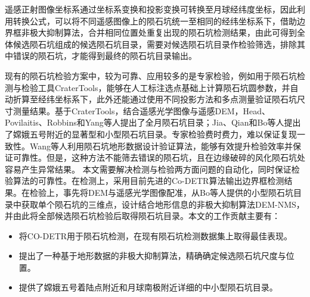 遥感正射图像坐标系通过坐标系变换和投影变换可转换至月球经纬度坐标，因此利用转换公式，可以将不同遥感图像上的陨石坑统一至相同的经纬坐标系下，借助边界框非极大抑制算法，合并相同位置处重复出现的陨石坑检测结果，由此可得到全体候选陨石坑组成的候选陨石坑目录，需要对候选陨石坑目录作检验筛选，排除其中错误的陨石坑，才能得到最终的陨石坑目录输出。

现有的陨石坑检验方案中，较为可靠、应用较多的是专家检验，例如用于陨石坑检测与检验工具CraterTools\cite{kneisslMapprojectionindependentCraterSizefrequency2011}，能够在人工标注选点基础上计算陨石坑圆参数，并自动折算至经纬坐标系下，此外还能通过使用不同投影方法和多点测量验证陨石坑尺寸测量结果。基于CraterTools，结合遥感光学图像与遥感DEM，Head\cite{headGlobalDistributionLarge2010}、Povilaitis\cite{povilaitisCraterDensityDifferences2018}、Robbins\cite{robbinsNewGlobalDatabase2019}和Yang\cite{yangLunarImpactCrater2020}等人提出了全月陨石坑目录；Jia\cite{jiaCatalogueImpactCraters2020}、Qian\cite{qianCopernicanaged200Ma2021}和Bo\cite{boCatalogueMeterscaleImpact2022}等人提出了嫦娥五号附近的显著型和小型陨石坑目录。专家检验费时费力，难以保证复现一致性。Wang\cite{wangImprovedGlobalCatalog2021}等人利用陨石坑地形数据设计验证算法，能够有效提升检验效率并保证可靠性。但是，这种方法不能筛去错误的陨石坑，且在边缘破碎的风化陨石坑处容易产生异常结果。
本文需要解决检测与检验两方面问题的自动化，同时保证检验算法的可靠性。在检测上，采用目前先进的Co-DETR算法输出边界框检测结果。在检验上，事先将DEM与遥感光学图像配准，从Bo\cite{boCatalogueMeterscaleImpact2022}等人提供的小型陨石坑目录中获取单个陨石坑的三维点，设计结合地形信息的非极大抑制算法DEM-NMS，并由此将全部候选陨石坑检验后取得陨石坑目录。本文的工作贡献主要有：
\begin{itemize}
  \item 将CO-DETR用于陨石坑检测，在现有陨石坑检测数据集上取得最佳表现。
  \item 提出了一种基于地形数据的非极大抑制算法，精确确定候选陨石坑尺度与位置。
  \item 提供了嫦娥五号着陆点附近和月球南极附近详细的中小型陨石坑目录。
\end{itemize}